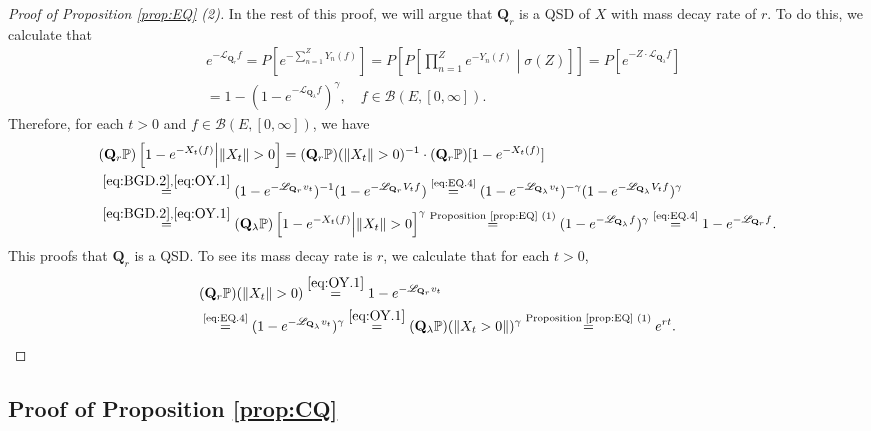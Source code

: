\documentclass[12pt,a4paper]{amsart}
\numberwithin{equation}{section}
\theoremstyle{plain}
\theoremstyle{definition}
\theoremstyle{remark}
\begin{document}
\begin{proof}[Proof of Proposition \ref{prop:EQ} (2)]
	In the rest of this proof, we will argue that $\mathbf Q_r$ is a QSD of $X$ with mass decay rate of $r$.
	 To do this, we calculate that
	\begin{align}
	&e^{- \mathscr L_{\mathbf Q_r} f}
	= P[ e^{-\sum_{n=1}^Z Y_n(f)} ] 	
	= P\left[P\left[ \prod_{n=1}^Z e^{-Y_n(f)} \middle | \sigma(Z)\right]\right]
	= P \left[ e^{-Z \cdot \mathscr L_{\mathbf Q_\lambda } f}\right]
	\\&= 1 - (1 - e^{- \mathscr L_{\mathbf Q_\lambda} f})^\gamma, \quad f\in \mathcal B(E,[0,\infty]).  \label{eq:EQ.4}
	\end{align}
	Therefore, for each $t> 0$ and $f\in \mathcal B(E,[0,\infty])$, we have
	\begin{align}
	&(\mathbf Q_r \mathbb P)\left[ 1 - e^{-X_t (f)} \middle|\|X_t\|>0 \right]
	= (\mathbf Q_r \mathbb P)(\|X_t\| >0)^{-1} \cdot (\mathbf Q_r \mathbb P) [1 - e^{- X_t(f)}]
	\\&\overset{\eqref{eq:BGD.2}, \eqref{eq:OY.1}}= (1 - e^{- \mathscr L_{\mathbf Q_r} v_t})^{-1}  (1 - e^{- \mathscr L_{\mathbf Q_r} V_tf})
	\overset{\text{\eqref{eq:EQ.4}}}= (1 - e^{- \mathscr L_{\mathbf Q_\lambda} v_t})^{-\gamma}(1 - e^{- \mathscr L_{\mathbf Q_\lambda} V_tf})^{\gamma}
	\\&\overset{\eqref{eq:BGD.2}, \eqref{eq:OY.1}}= (\mathbf Q_\lambda \mathbb P)\left[1 - e^{- X_t(f)}\middle| \|X_t\|>0\right]^{\gamma}
	\overset{\text{Proposition \ref{prop:EQ} (1)}}= (1 - e^{- \mathscr L_{\mathbf Q_\lambda} f})^{\gamma}
	\overset{\text{\eqref{eq:EQ.4}}}= 1 - e^{- \mathscr L_{\mathbf Q_r} f}.
	\end{align}
	This proofs that $\mathbf Q_r$ is a QSD.
	To see its mass decay rate is $r$, we calculate that for each $t>0$, 
\begin{align}
	&(\mathbf Q_r \mathbb P)(\|X_t\|>0) 
	\overset{\eqref{eq:OY.1}}= 1 - e^{- \mathscr L_{\mathbf Q_r} v_t} 
	\\& \overset{\text{\eqref{eq:EQ.4}}}= (1 - e^{- \mathscr L_{\mathbf Q_\lambda} v_t})^\gamma
	\overset{\eqref{eq:OY.1}}= (\mathbf Q_\lambda \mathbb P) (\|X_t > 0\|)^\gamma \overset{\text{Proposition \ref{prop:EQ} (1)}}= e^{ r t}. \qedhere
\end{align}
\end{proof}

\subsection{Proof of Proposition \ref{prop:CQ}} \label{sec:CQ}
\end{document}
